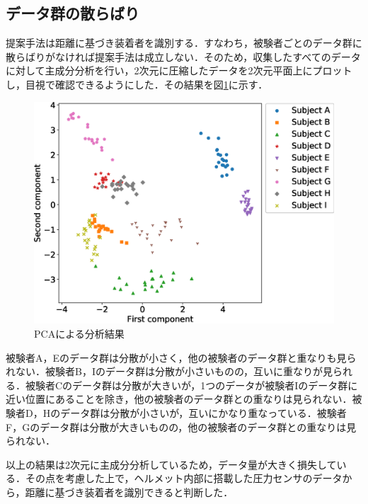 \documentclass[Japanese,noauthor]{dicomopapers}
\begin{document}
\subsection{データ群の散らばり}
提案手法は距離に基づき装着者を識別する．すなわち，被験者ごとのデータ群に散らばりがなければ提案手法は成立しない．そのため，収集したすべてのデータに対して主成分分析を行い，2次元に圧縮したデータを2次元平面上にプロットし，目視で確認できるようにした．その結果を図\ref{PCA}に示す．\par

\begin{figure}[!t]
  \begin{center}
    \includegraphics[width=1\linewidth]{figure/PCA.eps}
  \end{center}
  \caption{PCAによる分析結果}
  \label{PCA}
\end{figure}

被験者A，Eのデータ群は分散が小さく，他の被験者のデータ群と重なりも見られない．被験者B，Iのデータ群は分散が小さいものの，互いに重なりが見られる．被験者Cのデータ群は分散が大きいが，1つのデータが被験者Iのデータ群に近い位置にあることを除き，他の被験者のデータ群との重なりは見られない．被験者D，Hのデータ群は分散が小さいが，互いにかなり重なっている．被験者F，Gのデータ群は分散が大きいものの，他の被験者のデータ群との重なりは見られない．\par
以上の結果は2次元に主成分分析しているため，データ量が大きく損失している．その点を考慮した上で，ヘルメット内部に搭載した圧力センサのデータから，距離に基づき装着者を識別できると判断した．
\end{document}
